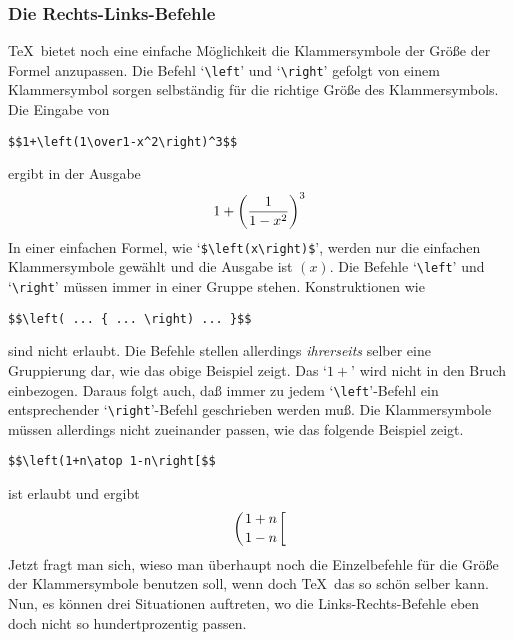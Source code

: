 \subsubsection{Die Rechts-Links-Befehle}
\TeX\ bietet noch eine einfache M\"oglichkeit die
Klammersymbole der
Gr\"o\ss{}e der Formel anzupassen. Die Befehl 
`\verb|\left|' und
`\verb|\right|' gefolgt von einem Klammersymbol sorgen selbst\"andig f\"ur
die richtige Gr\"o\ss{}e des Klammersymbols. Die Eingabe von
\begin{verbatim}
$$1+\left(1\over1-x^2\right)^3$$
\end{verbatim}
ergibt in der Ausgabe
$$1+\left(1\over1-x^2\right)^3$$
In einer einfachen Formel, wie 
`\verb|$\left(x\right)$|', werden nur
die einfachen Klammersymbole gew\"ahlt und die Ausgabe ist
$\left(x\right)$. Die Befehle `\verb|\left|' und `\verb|\right|'
m\"ussen immer in einer Gruppe stehen. Konstruktionen wie
\begin{verbatim}
$$\left( ... { ... \right) ... }$$
\end{verbatim}
sind nicht erlaubt. Die Befehle stellen allerdings {\em ihrerseits}
selber eine Gruppierung dar, wie das obige Beispiel zeigt. Das `$1+$'
wird nicht in den 
Bruch einbezogen. Daraus folgt auch, da\ss{} immer zu
jedem `\verb|\left|'-Befehl ein entsprechender `\verb|\right|'-Befehl
geschrieben werden mu\ss{}. Die Klammersymbole m\"ussen allerdings nicht
zueinander passen, wie das folgende Beispiel zeigt.
\begin{verbatim}
$$\left(1+n\atop 1-n\right[$$
\end{verbatim}
ist erlaubt und ergibt
$$\left(1+n\atop 1-n\right[$$
Jetzt fragt man sich, wieso man \"uberhaupt noch die Einzelbefehle f\"ur
die Gr\"o\ss{}e der Klammersymbole benutzen soll, wenn doch \TeX\ das so
sch\"on selber kann. Nun, es k\"onnen drei Situationen auftreten, wo die
Links-Rechts-Befehle eben doch nicht so hundertprozentig
passen.

